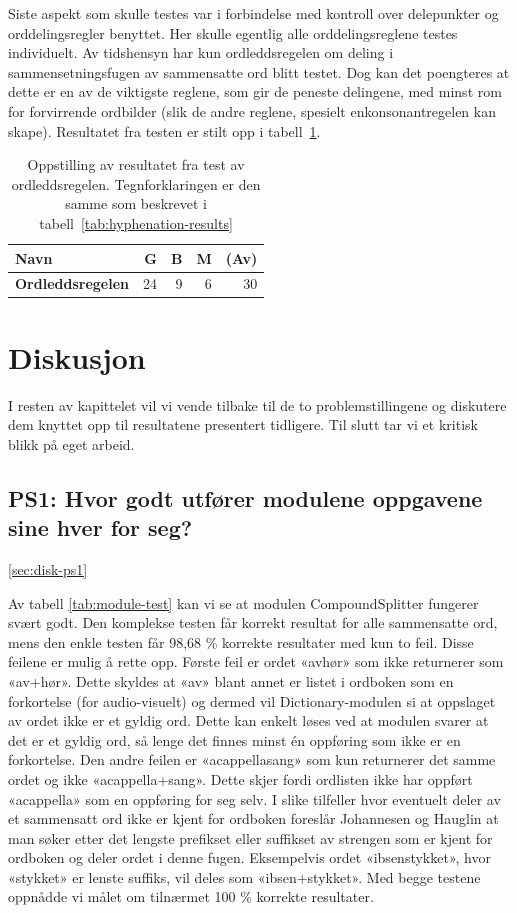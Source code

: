 Siste aspekt som skulle testes var i forbindelse med kontroll over delepunkter og orddelingsregler benyttet. Her skulle egentlig alle orddelingsreglene testes individuelt. Av tidshensyn har kun ordleddsregelen om deling i sammensetningsfugen av sammensatte ord blitt testet. Dog kan det poengteres at dette er en av de viktigste reglene, som gir de peneste delingene, med minst rom for forvirrende ordbilder (slik de andre reglene, spesielt enkonsonantregelen kan skape). Resultatet fra testen er stilt opp i tabell~\ref{tab:ordleddsregelen}.

\begin{table}[h]
	\centering 
	\begin{tabular}{lrrrr} \hline 
		\textbf{Navn} & \textbf{G} & \textbf{B} & \textbf{M} & \textbf{(Av)} \\
		\hline \textbf{Ordleddsregelen} & 24 & 9 & 6 & 30 \\
		\hline 
	\end{tabular}
	\caption[Resultater fra test av ordleddsregelen]{Oppstilling av resultatet fra test av ordleddsregelen. Tegnforklaringen er den samme som beskrevet i tabell~\ref{tab:hyphenation-results}} \label{tab:ordleddsregelen} 
\end{table}

\section{Diskusjon}

I resten av kapittelet vil vi vende tilbake til de to problemstillingene og diskutere dem knyttet opp til resultatene presentert tidligere. Til slutt tar vi et kritisk blikk på eget arbeid.

\subsection{PS1: Hvor godt utfører modulene oppgavene sine hver for seg?}
\ref{sec:disk-ps1}

Av tabell \ref{tab:module-test} kan vi se at modulen CompoundSplitter fungerer svært godt. Den komplekse testen får korrekt resultat for alle sammensatte ord, mens den enkle testen får 98,68 \% korrekte resultater med kun to feil. Disse feilene er mulig å rette opp. Første feil er ordet «avhør» som ikke returnerer som «av+hør». Dette skyldes at «av» blant annet er listet i ordboken som en forkortelse (for audio-visuelt) og dermed vil Dictionary-modulen si at oppslaget av ordet ikke er et gyldig ord. Dette kan enkelt løses ved at modulen svarer at det er et gyldig ord, så lenge det finnes minst én oppføring som ikke er en forkortelse. Den andre feilen er «acappellasang» som kun returnerer det samme ordet og ikke «acappella+sang». Dette skjer fordi ordlisten ikke har oppført «acappella» som en oppføring for seg selv. I slike tilfeller hvor eventuelt deler av et sammensatt ord ikke er kjent for ordboken foreslår Johannesen og Hauglin at man søker etter det lengste prefikset eller suffikset av strengen som er kjent for ordboken og deler ordet i denne fugen. Eksempelvis ordet «ibsenstykket», hvor «stykket» er lenste suffiks, vil deles som «ibsen+stykket». Med begge testene oppnådde vi målet om tilnærmet 100 \% korrekte resultater.

